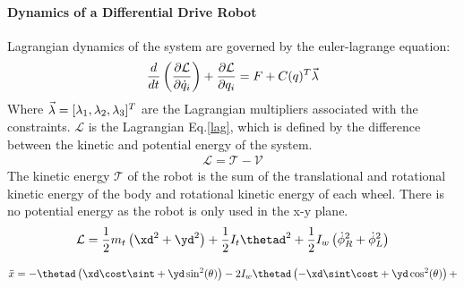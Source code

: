 \documentclass[MTRX3700report.tex]{subfiles}
\newcommand{\Lagr}{\mathcal{L}}
\begin{document}
\paragraph{Dynamics of a Differential Drive Robot}
Lagrangian dynamics of the system are governed by the euler-lagrange equation:
\begin{eqnarray}
\frac{d}{dt}\left( \frac{\partial \Lagr}{\partial \dot{q}_i} \right)+\frac{\partial \Lagr}{\partial q_i} = F + C(q)^T\lam
\end{eqnarray}
Where $\vec{\lambda} = [\lambda_1,\lambda_2,\lambda_3]^T$ are the Lagrangian multipliers associated with the constraints. $\Lagr$ is the Lagrangian Eq.\ref{lag}, which is defined by the difference between the kinetic and potential energy of the system.
\begin{eqnarray}
\Lagr = \mathcal{T}-\mathcal{V} \label{lag}
\end{eqnarray}
The kinetic energy $\mathcal{T}$ of the robot is the sum of the translational and rotational kinetic energy of the body and rotational kinetic energy of each wheel. There is no potential energy as the robot is only used in the x-y plane.
\begin{eqnarray}
\Lagr = \frac{1}{2}m_t\left( \xd^2+\yd^2 \right) + \frac{1}{2}I_t\thetad^2+\frac{1}{2}I_w\left( \dot{\phi}_R^2 + \dot{\phi}_L^2\right)
\end{eqnarray}



 
\begin{eqnarray}
\ddot{x} = -\thetad \left( \xd \cost\sint + \yd\sin^2(\theta)  \right) - 2I_w\thetad\left( -\xd \sint\cost + \yd \cos^2(\theta) \right) +   \label{xdd}
\end{eqnarray}
\end{document}
